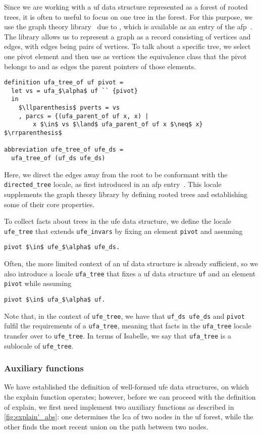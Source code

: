 \documentclass[
  sigplan,
  10pt,
  anonymous,
  review,
  ]{acmart}
\begin{document}
Since we are working with a \acrshort{uf} data structure represented as a forest of rooted trees, it is often to useful to focus on one tree in the forest.
For this purpose, we use the graph theory library~\cite{graph_theory} due to \citeauthor{graph_theory}, which is available as an entry of the \acrshort{afp}~\cite{graph_theory_afp}.
The library allows us to represent a graph as a record consisting of vertices and edges, with edges being pairs of vertices. 
To talk about a specific tree, we select one pivot element and then use as vertices the equivalence class that the pivot belongs to and as edges the parent pointers of those elements.
\begin{lstlisting}
definition ufa_tree_of uf pivot =
  let vs = ufa_$\alpha$ uf `` {pivot} 
  in
    $\llparenthesis$ pverts = vs
    , parcs = {(ufa_parent_of uf x, x) |
        x $\in$ vs $\land$ ufa_parent_of uf x $\neq$ x} $\rrparenthesis$  

abbreviation ufe_tree_of ufe_ds =
  ufa_tree_of (uf_ds ufe_ds)
\end{lstlisting}
Here, we direct the edges away from the root to be conformant with the \lstinline|directed_tree| locale, as first introduced in an \acrshort{afp} entry~\cite{query_optimization_afp}.
This locale supplements the graph theory library by defining rooted trees and establishing some of their core properties.

To collect facts about trees in the \acrshort{ufe} data structure, we define the locale \lstinline|ufe_tree| that extends \lstinline|ufe_invars| by fixing an element \lstinline|pivot| and assuming 
\begin{lstlisting}
pivot $\in$ ufe_$\alpha$ ufe_ds.
\end{lstlisting}
Often, the more limited context of an \acrshort{uf} data structure is already sufficient, so we also introduce a locale \lstinline|ufa_tree| that fixes a \acrshort{uf} data structure \lstinline|uf| and an element \lstinline|pivot| while assuming
\begin{lstlisting}
pivot $\in$ ufa_$\alpha$ uf.
\end{lstlisting}
Note that, in the context of \lstinline|ufe_tree|, we have that \lstinline|uf_ds ufe_ds| and \lstinline|pivot| fulfil the requirements of a \lstinline|ufa_tree|, meaning that facts in the \lstinline|ufa_tree| locale transfer over to \lstinline|ufe_tree|.
In terms of Isabelle, we say that \lstinline|ufa_tree| is a sublocale of \lstinline|ufe_tree|.

\subsubsection{Auxiliary functions}
We have established the definition of well-formed \acrshort{ufe} data structures, on which the explain function operates;
however, before we can proceed with the definition of explain, we first need implement two auxiliary functions as described in \autoref{fig:explain'_abs}:
one determines the \acrshort{lca} of two nodes in the \acrshort{uf} forest, while 
the other finds the most recent union on the path between two nodes.
\end{document}
